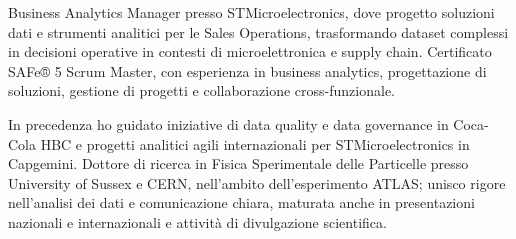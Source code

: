 
Business Analytics Manager presso STMicroelectronics, dove progetto soluzioni dati e strumenti analitici per le Sales Operations, trasformando dataset complessi in decisioni operative in contesti di microelettronica e supply chain. Certificato SAFe® 5 Scrum Master, con esperienza in business analytics, progettazione di soluzioni, gestione di progetti e collaborazione cross-funzionale.

In precedenza ho guidato iniziative di data quality e data governance in Coca-Cola HBC e progetti analitici agili internazionali per STMicroelectronics in Capgemini. Dottore di ricerca in Fisica Sperimentale delle Particelle presso University of Sussex e CERN, nell'ambito dell'esperimento ATLAS; unisco rigore nell'analisi dei dati e comunicazione chiara, maturata anche in presentazioni nazionali e internazionali e attività di divulgazione scientifica.

